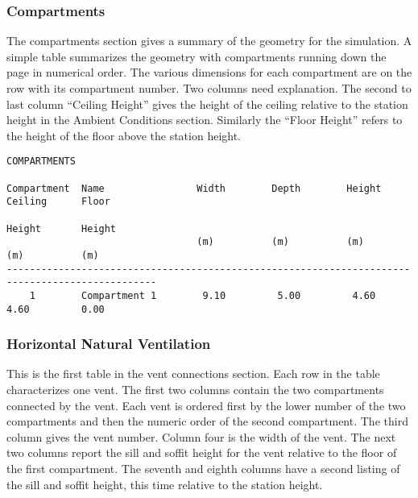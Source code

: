 \subsubsection{Compartments}

The compartments section gives a summary of the geometry for the simulation.  A simple table summarizes the geometry with compartments running down the page in numerical order.  The various dimensions for each compartment are on the row with its compartment number.  Two columns need explanation.  The second to last column ``Ceiling Height'' gives the height of the ceiling relative to the station height in the Ambient Conditions section.  Similarly the ``Floor Height'' refers to the height of the floor above the station height.

\begin{lstlisting}[basicstyle=\scriptsize]
COMPARTMENTS

Compartment  Name                Width        Depth        Height       Ceiling      Floor
                                                                        Height       Height
                                 (m)          (m)          (m)          (m)          (m)
------------------------------------------------------------------------------------------------
    1        Compartment 1        9.10         5.00         4.60         4.60         0.00
\end{lstlisting}


\subsubsection{Horizontal Natural Ventilation}

This is the first table in the vent connections section.  Each row in the table characterizes one vent.  The first two columns contain the two compartments connected by the vent.  Each vent is ordered first by the lower number of the two compartments and then the numeric order of the second compartment.  The third column gives the vent number.  Column four is the width of the vent.  The next two columns report the sill and soffit height for the vent relative to the floor of the first compartment.  The seventh and eighth columns have a second listing of the sill and soffit height, this time relative to the station height.

